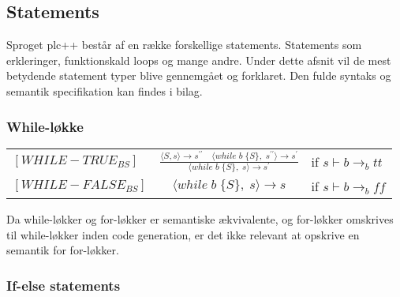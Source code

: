 

\noindent \subsection{Statements}
Sproget plc++ består af en række forskellige statements. Statements som erkleringer, funktionskald loops og mange andre. Under dette afsnit vil de mest betydende statement typer blive gennemgået og forklaret. Den fulde syntaks og semantik specifikation kan findes i bilag.







\noindent \subsubsection{While-løkke}

    \begin{semantik}
    \bgroup
    \def\arraystretch{3}
    \begin{table}[H]
    \centering
    \begin{tabular}{l c l}
        
        $[WHILE-TRUE_{BS}]$ & $
        \frac{\langle S, s\rangle  \rightarrow s^{\prime\prime} \quad \langle while\;b\;\{ S\},\;s^{\prime\prime}\rangle  \rightarrow s^{\prime}}
        {\langle while\;b\;\{ S\},\;s\rangle  \rightarrow s^{\prime}}
        $ & if $s \vdash b \rightarrow_b tt$ \\
        
        $[WHILE-FALSE_{BS}]$ & $
        \langle while\;b\;\{S\},\;s\rangle  \rightarrow s$ & 
        if $s \vdash b \rightarrow_b ff$ \\

    \end{tabular}
    \label{tab:while}
    \end{table}
    \egroup
    \caption{While-løkke}
    \end{semantik}
    
Da while-løkker og for-løkker er semantiske ækvivalente, og for-løkker omskrives til while-løkker inden code generation, er det ikke relevant at opskrive en semantik for for-løkker.

\noindent \subsubsection{If-else statements}

